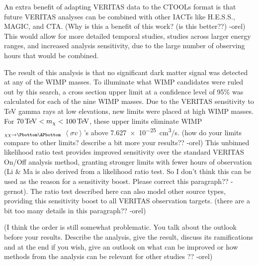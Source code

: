 An extra benefit of adapting VERITAS data to the CTOOLs format is that future VERITAS analyses can be combined with other IACTs like H.E.S.S., MAGIC, and CTA.
{\color{red}(Why is this a benefit of this work? (is this better??) -orel)}
This would allow for more detailed temporal studies, studies across larger energy ranges, and increased analysis sensitivity, due to the large number of observing hours that would be combined.

The result of this analysis is that no significant dark matter signal was detected at any of the WIMP masses.
To illuminate what WIMP candidates were ruled out by this search, a cross section upper limit at a confidence level of 95\% was calculated for each of the nine WIMP masses.
Due to the VERITAS sensitivity to TeV gamma rays at low elevations, new limits were placed at high WIMP masses.
For $70\,\TeV<m_{\chi}<100\,\TeV$, these upper limits eliminate WIMP$_{\chi\chi\rightarrow\Pbottom\APbottom}$ $\left \langle \sigma v \right \rangle$'s above \SI{7.627e-25}{cm^3/s}.
{\color{red}(how do your limits compare to other limits? describe a bit more your results?? -orel)}
This unbinned likelihood ratio test provides improved sensitivity over the standard VERITAS On/Off analysis method, granting stronger limits with fewer hours of observation {\color{red}(Li & Ma is also derived from a likelihood ratio test. So I don’t think this can be used as the reason for a sensitivity boost. Please correct this paragraph?? -gernot)}.
The ratio test described here can also model other source types, providing this sensitivity boost to all VERITAS observation targets.
{\color{red}(there are a bit too many details in this paragraph?? -orel)}

{\color{red}(I think the order is still somewhat problematic.
You talk about the outlook before your results.
Describe the analysis, give the result, discuss its ramifications and at the end if you wish, give an outlook on what can be improved or how methods from the analysis can be relevant for other studies ?? -orel)}
